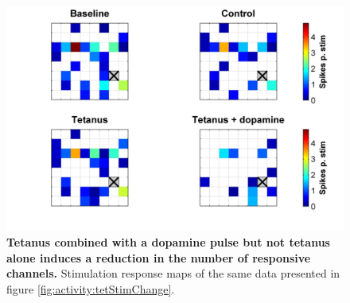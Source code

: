         \begin{figure}[!htb]
            \centering
            \includegraphics[width=15cm]{chapter3/figures/tetMapChange/tetMapChange.jpg}

            \caption[Example stimulation response maps for the combined dopamine and tetanus plasticity induction experiment]{\textbf{Tetanus combined with a dopamine pulse but not tetanus alone induces a reduction in the number of responsive channels.} Stimulation response maps of the same data presented in figure \ref{fig:activity:tetStimChange}.}
            \label{fig:activity:tetMapChange}
        \end{figure}


